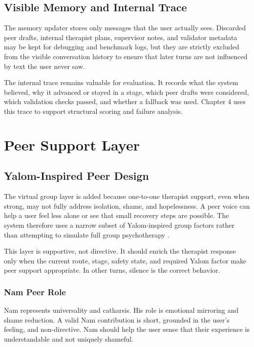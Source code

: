 \subsection{Visible Memory and Internal Trace}

The memory updater stores only messages that the user actually sees. Discarded peer drafts, internal therapist plans, supervisor notes, and validator metadata may be kept for debugging and benchmark logs, but they are strictly excluded from the visible conversation history to ensure that later turns are not influenced by text the user never saw.

The internal trace remains valuable for evaluation. It records what the system believed, why it advanced or stayed in a stage, which peer drafts were considered, which validation checks passed, and whether a fallback was used. Chapter 4 uses this trace to support structural scoring and failure analysis.

\section{Peer Support Layer}

\subsection{Yalom-Inspired Peer Design}

The virtual group layer is added because one-to-one therapist support, even when strong, may not fully address isolation, shame, and hopelessness. A peer voice can help a user feel less alone or see that small recovery steps are possible. The system therefore uses a narrow subset of Yalom-inspired group factors rather than attempting to simulate full group psychotherapy \citep{Yalom2020GroupPsychotherapy}.

This layer is supportive, not directive. It should enrich the therapist response only when the current route, stage, safety state, and required Yalom factor make peer support appropriate. In other turns, silence is the correct behavior.

\subsubsection{Nam Peer Role}

Nam represents universality and catharsis. His role is emotional mirroring and shame reduction. A valid Nam contribution is short, grounded in the user's feeling, and non-directive. Nam should help the user sense that their experience is understandable and not uniquely shameful.

